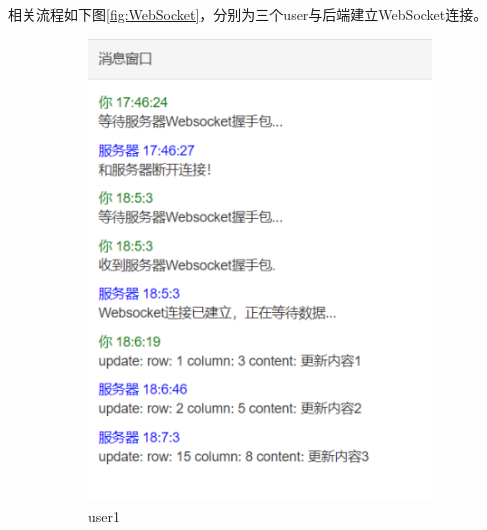 \documentclass[UTF8]{ctexart}
\begin{document}
\par 相关流程如下图\ref{fig:WebSocket}，分别为三个user与后端建立WebSocket连接。
\begin{figure}[h]
	\centering
	\begin{subfigure}[b]{0.3\textwidth}
		\includegraphics[width=\textwidth]{be3.png}
		\caption{user1}
	\end{subfigure}
	\begin{subfigure}[b]{0.3\textwidth}

\end{subfigure}
\end{figure}
\end{document}
